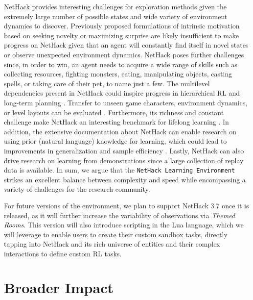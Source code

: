 \documentclass{article}
\newcommand{\nethack}{NetHack}
\newcommand{\nethackenv}{\texttt{NetHack Learning Environment}}
\begin{document}
\nethack{} provides interesting challenges for exploration methods
given the extremely large number of possible states and wide variety
of environment dynamics to discover.
Previously proposed formulations of intrinsic motivation based on
seeking novelty \citep{bellemare2016unifying, ostrovski2017count,
  DBLP:conf/iclr/BurdaESK19} or maximizing surprise
\citep{pathak2017curiosity,
  DBLP:conf/iclr/BurdaEPSDE19,raileanu2020ride} are likely
insufficient to make progress on \nethack{} given that an agent will
constantly find itself in novel states or observe unexpected
environment dynamics.
\nethack{} poses further challenges since, in order to win, an agent
needs to acquire a wide range of skills such as collecting resources,
fighting monsters, eating, manipulating objects, casting spells, or
taking care of their pet, to name just a few.
The multilevel
dependencies present in \nethack{} could inspire progress in
hierarchical RL and long-term planning \citep{Dayan1992FeudalRL,
  Kaelbling1996ReinforcementLA, Parr1997ReinforcementLW,
  Vezhnevets2017FeUdalNF}.  Transfer to unseen game characters,
environment dynamics, or level layouts can be evaluated
\citep{Taylor2009TransferLF}.  Furthermore, its richness and constant
challenge make \nethack{} an interesting benchmark for lifelong
learning \citep{lopez2017gradient, Parisi2019ContinualLL,
  Rolnick2018ExperienceRF, Mankowitz2018UnicornCL}.  In addition, the
extensive documentation about \nethack{} can enable research on using
prior (natural language) knowledge for learning, which
could lead to improvements in generalization and sample efficiency
\citep{Branavan2011LearningTW, luketina2019survey, Zhong2019RTFMGT,
  Jiang2019LanguageAA}.  Lastly, \nethack{} can also drive research on
learning from demonstrations \citep{Abbeel2004ApprenticeshipLV,
  Argall2009ASO} since a large collection of replay data is available.
In sum, we argue that the \nethackenv{} strikes an excellent balance between
complexity and speed while encompassing a variety of challenges for
the research community.

For future versions of the environment, we plan to support NetHack 3.7 once it is released, as it will further increase the variability of observations via \emph{Themed Rooms}. This version will also introduce scripting in the Lua language, which we will leverage to enable users to create their custom sandbox tasks, directly tapping into NetHack and its rich universe of entities and their complex interactions to define custom RL tasks.

\section{Broader Impact}
\end{document}

